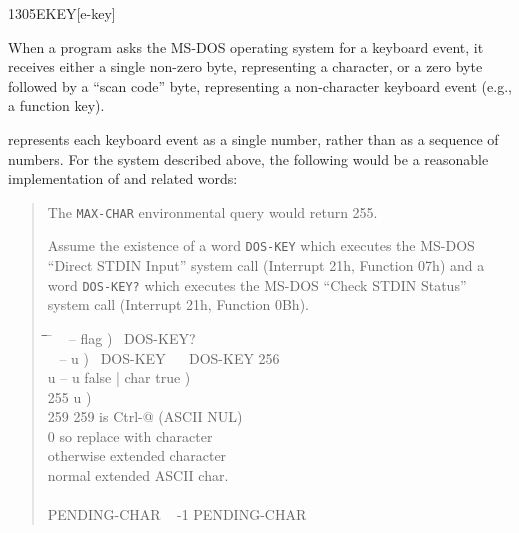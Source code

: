 \begin{newword}{1305}{EKEY}[e-key]
\begin{rationale}
		When a program asks the MS-DOS operating system for a keyboard
		event, it receives either a single non-zero byte, representing
		a character, or a zero byte followed by a ``scan code'' byte,
		representing a non-character keyboard event (e.g., a function
		key).

		 represents each keyboard event as a single number,
		rather than as a sequence of numbers. For the system described
		above, the following would be a reasonable implementation of
		 and related words:

		\begin{quote}
			The \texttt{MAX-CHAR} environmental query would return 255.

			Assume the existence of a word
			\texttt{DOS-KEY} 
			which executes the MS-DOS ``Direct STDIN Input'' system call
			(Interrupt 21h, Function 07h) and a word
			\texttt{DOS-KEY?} 
			which executes the MS-DOS ``Check STDIN Status'' system call
			(Interrupt 21h, Function 0Bh).

			\ttfamily
			\begin{tabbing}
			\tab \= \tab \= \tab \= \tab \= \hspace{7em} \= \kill
			\word{:} ~  -- flag )~
				DOS-KEY?~  \word{;} \\[\parskip]

			\word{:} ~  -- u )~
				DOS-KEY~   ~
					DOS-KEY 256 \word{+}~  \word{;} \\[\parskip]

			\+ \word{:}   u -- u false | char true ) \\
				\+  255   		\>\>\>\>	\word{p} u ) \\
					 259 \word{=}  		\>\>\>		 259 is Ctrl-@ (ASCII NUL) \\
					\>  0  \>\>		 so replace with character \\
				\-   		\>\>\>		 otherwise extended character \\
			\-  						\>\>\>\>	 normal extended ASCII char. \\
			\word{;} \\[\parskip]

			 PENDING-CHAR ~ -1 PENDING-CHAR \word{!} \\[\parskip]


\end{tabbing}
\end{quote}
\end{rationale}
\end{newword}
